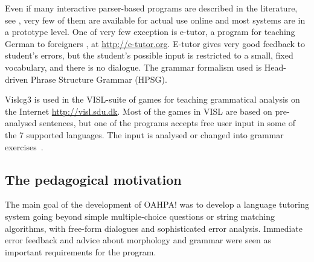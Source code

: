 \documentclass[11pt]{article}
\begin{document}
Even if many interactive parser-based programs are described in the literature, see \cite{Gamper:02,Heift:07}, very few of them are available for actual use online and most systems are in a prototype level. One of very few exception is e-tutor, a program for teaching German to foreigners \cite{Heift:01,Heift:02}, at \url{http://e-tutor.org}. E-tutor gives very good feedback to student's errors, but the student's possible input is restricted to a small, fixed vocabulary, and there is no dialogue. The grammar formalism used is Head-driven Phrase Structure Grammar (HPSG).

Vislcg3 is used in the VISL-suite of games for teaching grammatical analysis on the Internet \url{http://visl.sdu.dk}. Most of the games in VISL are based on pre-analysed sentences, but one of the programs accepts free user input in some of the 7 supported languages. The input is analysed or changed into grammar exercises~\cite{Bick:05}.


\subsection{The pedagogical motivation} \label{pedidea}

The main goal of the development of OAHPA! was to develop a language tutoring system going beyond simple multiple-choice questions or string matching algorithms, with free-form dialogues and sophisticated error analysis. Immediate error feedback and advice about morphology and grammar 
were seen as important requirements for the program.
\end{document}
